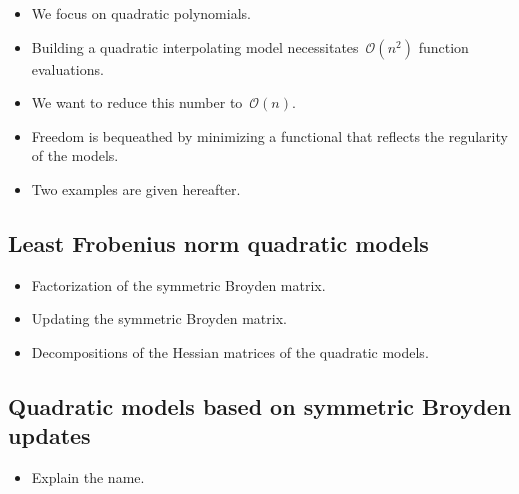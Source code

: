 \begin{itemize}
    \item We focus on quadratic polynomials.
    \item Building a quadratic interpolating model necessitates~$\mathcal{O}(n^2)$ function evaluations.
    \item We want to reduce this number to~$\mathcal{O}(n)$.
    \item Freedom is bequeathed by minimizing a functional that reflects the regularity of the models.
    \item Two examples are given hereafter.
\end{itemize}

\subsection{Least Frobenius norm quadratic models}

\begin{itemize}
    \item Factorization of the symmetric Broyden matrix.
    \item Updating the symmetric Broyden matrix.
    \item Decompositions of the Hessian matrices of the quadratic models.
\end{itemize}

\subsection{Quadratic models based on symmetric Broyden updates}

\begin{itemize}
    \item Explain the name.
\end{itemize}
